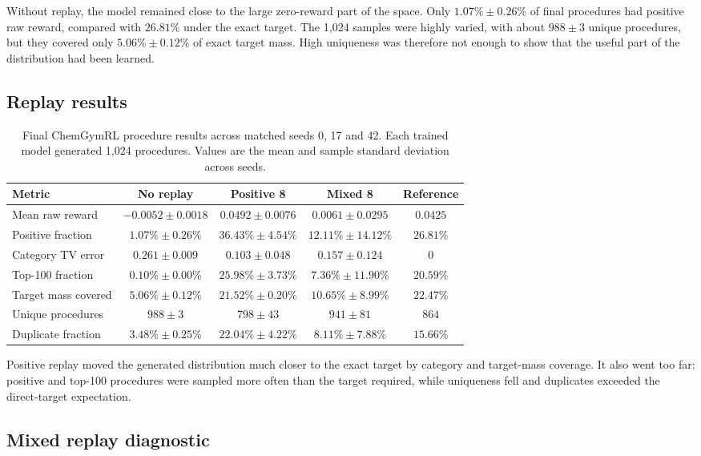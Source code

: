 \documentclass{article}
\begin{document}
Without replay, the model remained close to the large zero-reward part of the space. Only $1.07\%\pm0.26\%$ of final procedures had positive raw reward, compared with $26.81\%$ under the exact target. The 1,024 samples were highly varied, with about $988\pm3$ unique procedures, but they covered only $5.06\%\pm0.12\%$ of exact target mass. High uniqueness was therefore not enough to show that the useful part of the distribution had been learned.

\subsection{Replay results}

\begin{table}[htbp]
\centering
\begin{tabular}{l c c c c}
\hline
Metric & No replay & Positive 8 & Mixed 8 & Reference \\
\hline
Mean raw reward & $-0.0052\pm0.0018$ & $0.0492\pm0.0076$ & $0.0061\pm0.0295$ & $0.0425$ \\
Positive fraction & $1.07\%\pm0.26\%$ & $36.43\%\pm4.54\%$ & $12.11\%\pm14.12\%$ & $26.81\%$ \\
Category TV error & $0.261\pm0.009$ & $0.103\pm0.048$ & $0.157\pm0.124$ & $0$ \\
Top-100 fraction & $0.10\%\pm0.00\%$ & $25.98\%\pm3.73\%$ & $7.36\%\pm11.90\%$ & $20.59\%$ \\
Target mass covered & $5.06\%\pm0.12\%$ & $21.52\%\pm0.20\%$ & $10.65\%\pm8.99\%$ & $22.47\%$ \\
Unique procedures & $988\pm3$ & $798\pm43$ & $941\pm81$ & $864$ \\
Duplicate fraction & $3.48\%\pm0.25\%$ & $22.04\%\pm4.22\%$ & $8.11\%\pm7.88\%$ & $15.66\%$ \\
\hline
\end{tabular}
\caption{Final ChemGymRL procedure results across matched seeds 0, 17 and 42. Each trained model generated 1,024 procedures. Values are the mean and sample standard deviation across seeds.}
\label{tab:chemgymrl-replay-results}
\end{table}

Positive replay moved the generated distribution much closer to the exact target by category and target-mass coverage. It also went too far: positive and top-100 procedures were sampled more often than the target required, while uniqueness fell and duplicates exceeded the direct-target expectation.

\subsection{Mixed replay diagnostic}
\end{document}
